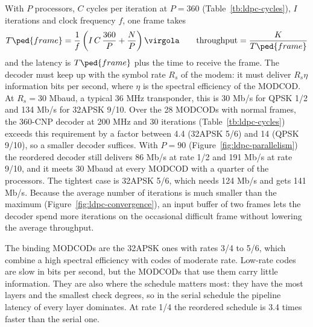 With \(P\) processors, \(C\) cycles per iteration at \(P = 360\) (Table~\ref{tb:ldpc-cycles}), \(I\) iterations and clock frequency \(f\), one frame takes
\begin{equation} \label{eq:ldpc-throughput}
T\ped{frame} = \frac{1}{f}\left( I\,C\,\frac{360}{P} + \frac{N}{P} \right) \virgola \qquad \text{throughput} = \frac{K}{T\ped{frame}}
\end{equation}
and the latency is \(T\ped{frame}\) plus the time to receive the frame. The decoder must keep up with the symbol rate \(R_s\) of the modem: it must deliver \(R_s \eta\) information bits per second, where \(\eta\) is the spectral efficiency of the MODCOD. At \(R_s = 30\) Mbaud, a typical 36 MHz transponder, this is 30 Mb/s for QPSK 1/2 and 134 Mb/s for 32APSK 9/10. Over the 28 MODCODs with normal frames, the 360-CNP decoder at 200 MHz and 30 iterations (Table~\ref{tb:ldpc-cycles}) exceeds this requirement by a factor between 4.4 (32APSK 5/6) and 14 (QPSK 9/10), so a smaller decoder suffices. With \(P = 90\) (Figure~\ref{fig:ldpc-parallelism}) the reordered decoder still delivers 86 Mb/s at rate 1/2 and 191 Mb/s at rate 9/10, and it meets 30 Mbaud at every MODCOD with a quarter of the processors. The tightest case is 32APSK 5/6, which needs 124 Mb/s and gets 141 Mb/s. Because the average number of iterations is much smaller than the maximum (Figure~\ref{fig:ldpc-convergence}), an input buffer of two frames lets the decoder spend more iterations on the occasional difficult frame without lowering the average throughput.

The binding MODCODs are the 32APSK ones with rates 3/4 to 5/6, which combine a high spectral efficiency with codes of moderate rate. Low-rate codes are slow in bits per second, but the MODCODs that use them carry little information. They are also where the schedule matters most: they have the most layers and the smallest check degrees, so in the serial schedule the pipeline latency of every layer dominates. At rate 1/4 the reordered schedule is 3.4 times faster than the serial one.

